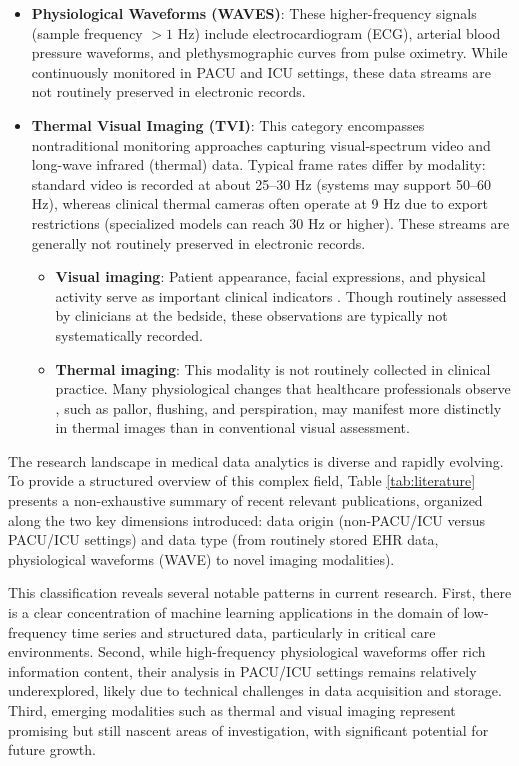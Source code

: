 \begin{itemize}
  \item \textbf{Physiological Waveforms (WAVES)}: These higher-frequency signals (sample frequency $> 1$ Hz) include electrocardiogram (ECG), arterial blood pressure waveforms, and plethysmographic curves from pulse oximetry. While continuously monitored in PACU and ICU settings, these data streams are not routinely preserved in electronic records.
  \item \textbf{Thermal Visual Imaging (TVI)}: This category encompasses nontraditional monitoring approaches capturing visual-spectrum video and long-wave infrared (thermal) data. Typical frame rates differ by modality: standard video is recorded at about 25--30 Hz (systems may support 50--60 Hz), whereas clinical thermal cameras often operate at 9 Hz due to export restrictions (specialized models can reach 30 Hz or higher). These streams are generally not routinely preserved in electronic records.
        \begin{itemize}
          \item \textbf{Visual imaging}: Patient appearance, facial expressions, and physical activity serve as important clinical indicators \citep{larsen2005anasthesie}. Though routinely assessed by clinicians at the bedside, these observations are typically not systematically recorded.
          \item \textbf{Thermal imaging}: This modality is not routinely collected in clinical practice. Many physiological changes that healthcare professionals observe \citep{larsen2005anasthesie}, such as pallor, flushing, and perspiration, may manifest more distinctly in thermal images than in conventional visual assessment.
        \end{itemize}
\end{itemize}

The research landscape in medical data analytics is diverse and rapidly evolving. To provide a structured overview of this complex field, Table \ref{tab:literature} presents a non-exhaustive summary of recent relevant publications, organized along the two key dimensions introduced: data origin (non-PACU/ICU versus PACU/ICU settings) and data type (from routinely stored EHR data, physiological waveforms (WAVE) to novel imaging modalities).

This classification reveals several notable patterns in current research. First, there is a clear concentration of machine learning applications in the domain of low-frequency time series and structured data, particularly in critical care environments. Second, while high-frequency physiological waveforms offer rich information content, their analysis in PACU/ICU settings remains relatively underexplored, likely due to technical challenges in data acquisition and storage. Third, emerging modalities such as thermal and visual imaging represent promising but still nascent areas of investigation, with significant potential for future growth.

